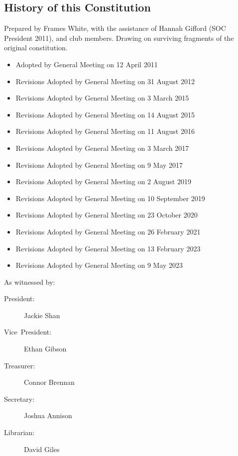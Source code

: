 \documentclass[a4paper]{article}
\begin{document}
\begin{appendices}

    \section{History of this Constitution} \label{sec:app:history}

    \noindent Prepared by Frames White, with the assistance of Hannah Gifford (SOC President 2011), and club members. Drawing on surviving fragments of the original constitution.

    \medskip{}

    \begin{itemize}[label={}]
        \item Adopted by General Meeting on 12 April 2011
        \item Revisions Adopted by General Meeting on 31 August 2012
        \item Revisions Adopted by General Meeting on 3 March 2015
        \item Revisions Adopted by General Meeting on 14 August 2015
        \item Revisions Adopted by General Meeting on 11 August 2016
        \item Revisions Adopted by General Meeting on 3 March 2017
        \item Revisions Adopted by General Meeting on 9 May 2017
        \item Revisions Adopted by General Meeting on 2 August 2019
        \item Revisions Adopted by General Meeting on 10 September 2019
        \item Revisions Adopted by General Meeting on 23 October 2020
        \item Revisions Adopted by General Meeting on 26 February 2021
        \item Revisions Adopted by General Meeting on 13 February 2023
        \item Revisions Adopted by General Meeting on 9 May 2023
    \end{itemize}

    \medskip{}

    \noindent As witnessed by:
    \begin{description}
        \item[{President:}] Jackie Shan
        \item[{Vice~President:}] Ethan Gibson
        \item[{Treasurer:}] Connor Brennan
        \item[{Secretary:}] Joshua Annison
        \item[{Librarian:}] David Giles
    \end{description}

\end{appendices}
\end{document}
